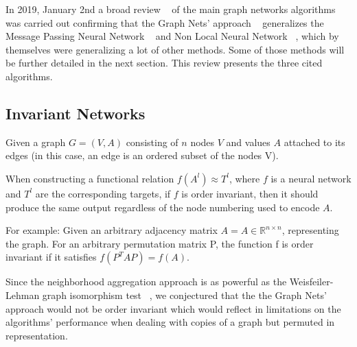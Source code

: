 In 2019, January 2nd a broad review ~\cite{Zhou_2019} of the main graph networks algorithms was carried out confirming that the Graph Nets’ approach ~\cite{Battaglia_2018} generalizes the Message Passing Neural Network ~\cite{Gilmer_2017} and Non Local Neural Network ~\cite{Wang_2018}, which by themselves were generalizing a lot of other methods. Some of those methods will be further detailed in the next section. This review presents the three cited algorithms. 


\subsection{Invariant Networks}

Given a graph $G = (V, A)$ consisting of $n$ nodes $V$ and values $A$ attached to its edges (in this case, an edge is an ordered subset of the nodes V).

When constructing a functional relation $f(A^l) \approx T^l$, where $f$ is a neural network and $T^l$ are the corresponding targets, if $f$ is order invariant, then it should produce the same output regardless of the node numbering used to encode $A$.

For example: Given an arbitrary adjacency matrix $A = A \in \mathds{R}^{n \times n}$, representing the graph. For an arbitrary permutation matrix P, the function f is order invariant if it satisfies $f(P^T A P) = f(A)$.

Since the neighborhood aggregation approach is as powerful as the Weisfeiler-Lehman graph isomorphism test ~\cite{Xu_2018}, we conjectured that the the Graph Nets’ approach would not be order invariant which would reflect in limitations on the algorithms’ performance when dealing with copies of a graph but permuted in representation. 